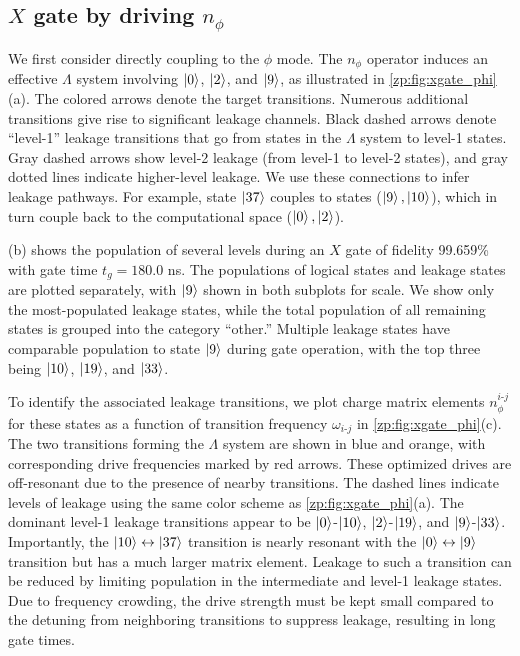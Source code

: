 \subsection{\texorpdfstring{$X$}{X} gate by driving \texorpdfstring{$n_\phi$}{phi} } \label{zp:sec:1q_phi}

We first consider directly coupling to the $\phi$ mode.
The $n_\phi$ operator induces an effective $\Lambda$ system involving $\ket{0}$, $\ket{2}$, and $\ket{9}$, as illustrated in \cref{zp:fig:xgate_phi}(a).
The colored arrows denote the target transitions.
Numerous additional transitions give rise to significant leakage channels.
Black dashed arrows denote ``level-1'' leakage transitions that go from states in the $\Lambda$ system to level-1 states.
Gray dashed arrows show level-2 leakage (from level-1 to level-2 states), and gray dotted lines indicate higher-level leakage.
We use these connections to infer leakage pathways.
For example, state $\ket{37}$ couples to states ($\ket{9},\ket{10}$), which in turn couple back to the computational space ($\ket{0},\ket{2}$).

(b) shows the population of several levels during an $X$ gate of fidelity 99.659\% with gate time $t_g=180.0$ ns.
The populations of logical states and leakage states are plotted separately, with $\ket{9}$ shown in both subplots for scale.
We show only the most-populated leakage states, while the total population of all remaining states is grouped into the category “other.” Multiple leakage states have comparable population to state $\ket{9}$ during gate operation, with the top three being $\ket{10}$, $\ket{19}$, and $\ket{33}$.

To identify the associated leakage transitions, we plot charge matrix elements $n_\phi^{i \text{-} j}$ for these states as a function of transition frequency $\omega_{i \text{-} j}$ in \cref{zp:fig:xgate_phi}(c).
The two transitions forming the $\Lambda$ system are shown in blue and orange, with corresponding drive frequencies marked by red arrows.
These optimized drives are off-resonant due to the presence of nearby transitions.
The dashed lines indicate levels of leakage using the same color scheme as \cref{zp:fig:xgate_phi}(a).
The dominant level-1 leakage transitions appear to be $\ket{0}$-$\ket{10}$, $\ket{2}$-$\ket{19}$, and $\ket{9}$-$\ket{33}$.
Importantly, the $\ket{10} \leftrightarrow \ket{37}$ transition is nearly resonant with the $\ket{0} \leftrightarrow \ket{9}$ transition but has a much larger matrix element.
Leakage to such a transition can be reduced by limiting population in the intermediate and level-1 leakage states.
Due to frequency crowding, the drive strength must be kept small compared to the detuning from neighboring transitions to suppress leakage, resulting in long gate times.

